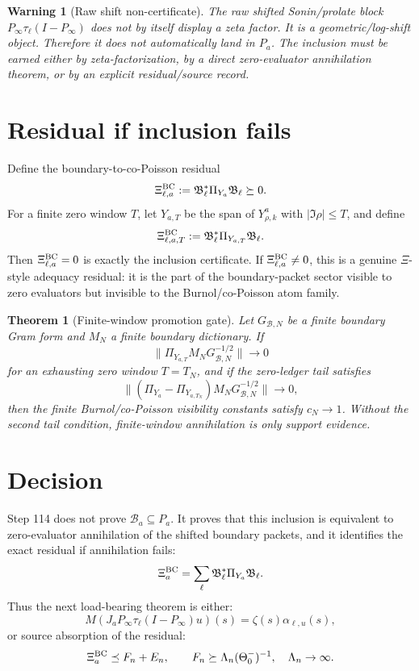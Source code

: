\documentclass[11pt]{article}
\newtheorem{theorem}{Theorem}
\newtheorem{warning}{Warning}
\begin{document}
\begin{warning}[Raw shift non-certificate]
The raw shifted Sonin/prolate block $P_\infty\tau_\ell(I-P_\infty)$ does not by itself display a zeta factor.  It is a geometric/log-shift object.  Therefore it does not automatically land in $P_a$.  The inclusion must be earned either by zeta-factorization, by a direct zero-evaluator annihilation theorem, or by an explicit residual/source record.
\end{warning}

\section{Residual if inclusion fails}
Define the boundary-to-co-Poisson residual
\[
  \Xi^{\rm BC}_{\ell,a}
  :=\mathfrak B_\ell^*\Pi_{Y_a}\mathfrak B_\ell\succeq0.
\]
For a finite zero window $T$, let $Y_{a,T}$ be the span of $Y^a_{\rho,k}$ with $|\Im\rho|\le T$, and define
\[
  \Xi^{\rm BC}_{\ell,a,T}
  :=\mathfrak B_\ell^*\Pi_{Y_{a,T}}\mathfrak B_\ell.
\]
Then $\Xi^{\rm BC}_{\ell,a}=0$ is exactly the inclusion certificate.  If $\Xi^{\rm BC}_{\ell,a}\ne0$, this is a genuine $\Xi$-style adequacy residual: it is the part of the boundary-packet sector visible to zero evaluators but invisible to the Burnol/co-Poisson atom family.

\begin{theorem}[Finite-window promotion gate]
Let $G_{\mathcal B,N}$ be a finite boundary Gram form and $M_N$ a finite boundary dictionary.  If
\[
  \|\Pi_{Y_{a,T}}M_NG_{\mathcal B,N}^{-1/2}\|\to0
\]
for an exhausting zero window $T=T_N$, and if the zero-ledger tail satisfies
\[
  \|(\Pi_{Y_a}-\Pi_{Y_{a,T_N}})M_NG_{\mathcal B,N}^{-1/2}\|\to0,
\]
then the finite Burnol/co-Poisson visibility constants satisfy $c_N\to1$.
Without the second tail condition, finite-window annihilation is only support evidence.
\end{theorem}

\section{Decision}
Step 114 does not prove $\mathcal B_a\subseteq P_a$.  It proves that this inclusion is equivalent to zero-evaluator annihilation of the shifted boundary packets, and it identifies the exact residual if annihilation fails:
\[
  \Xi^{\rm BC}_{a}=\sum_{\ell}\mathfrak B_\ell^*\Pi_{Y_a}\mathfrak B_\ell.
\]
Thus the next load-bearing theorem is either:
\[
  M(J_aP_\infty\tau_\ell(I-P_\infty)u)(s)=\zeta(s)\alpha_{\ell,u}(s),
\]
or source absorption of the residual:
\[
  \Xi^{\rm BC}_{a}\preceq F_n+E_n,
  \qquad F_n\succeq \Lambda_n(\Theta_0^-)^{-1},\quad \Lambda_n\to\infty.
\]
\end{document}
